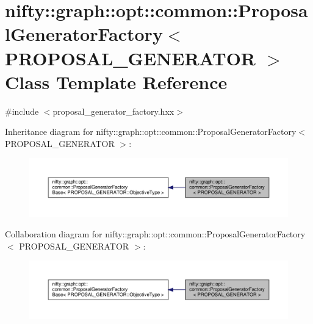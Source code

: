 \hypertarget{classnifty_1_1graph_1_1opt_1_1common_1_1ProposalGeneratorFactory}{}\section{nifty\+:\+:graph\+:\+:opt\+:\+:common\+:\+:Proposal\+Generator\+Factory$<$ P\+R\+O\+P\+O\+S\+A\+L\+\_\+\+G\+E\+N\+E\+R\+A\+T\+OR $>$ Class Template Reference}
\label{classnifty_1_1graph_1_1opt_1_1common_1_1ProposalGeneratorFactory}


{\ttfamily \#include $<$proposal\+\_\+generator\+\_\+factory.\+hxx$>$}



Inheritance diagram for nifty\+:\+:graph\+:\+:opt\+:\+:common\+:\+:Proposal\+Generator\+Factory$<$ P\+R\+O\+P\+O\+S\+A\+L\+\_\+\+G\+E\+N\+E\+R\+A\+T\+OR $>$\+:
\nopagebreak
\begin{figure}[H]
\begin{center}
\leavevmode
\includegraphics[width=350pt]{classnifty_1_1graph_1_1opt_1_1common_1_1ProposalGeneratorFactory__inherit__graph}
\end{center}
\end{figure}


Collaboration diagram for nifty\+:\+:graph\+:\+:opt\+:\+:common\+:\+:Proposal\+Generator\+Factory$<$ P\+R\+O\+P\+O\+S\+A\+L\+\_\+\+G\+E\+N\+E\+R\+A\+T\+OR $>$\+:
\nopagebreak
\begin{figure}[H]
\begin{center}
\leavevmode
\includegraphics[width=350pt]{classnifty_1_1graph_1_1opt_1_1common_1_1ProposalGeneratorFactory__coll__graph}
\end{center}
\end{figure}
